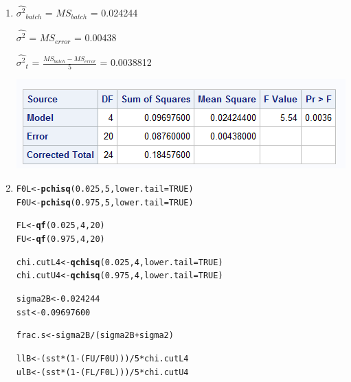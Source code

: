 \documentclass{article}\usepackage[]{graphicx}\usepackage[]{color}
\makeatletter
\newcommand{\hlnum}[1]{\textcolor[rgb]{0.686,0.059,0.569}{#1}}%
\newcommand{\hlopt}[1]{\textcolor[rgb]{0,0,0}{#1}}%
\newcommand{\hlstd}[1]{\textcolor[rgb]{0.345,0.345,0.345}{#1}}%
\newcommand{\hlkwb}[1]{\textcolor[rgb]{0.69,0.353,0.396}{#1}}%
\newcommand{\hlkwc}[1]{\textcolor[rgb]{0.333,0.667,0.333}{#1}}%
\newcommand{\hlkwd}[1]{\textcolor[rgb]{0.737,0.353,0.396}{\textbf{#1}}}%
\newenvironment{kframe}{%
 \def\at@end@of@kframe{}%
 \ifinner\ifhmode%
  \def\at@end@of@kframe{\end{minipage}}%
  \begin{minipage}{\columnwidth}%
 \fi\fi%
 \def\FrameCommand##1{\hskip\@totalleftmargin \hskip-\fboxsep
 \colorbox{shadecolor}{##1}\hskip-\fboxsep
     \hskip-\linewidth \hskip-\@totalleftmargin \hskip\columnwidth}%
 \MakeFramed {\advance\hsize-\width
   \@totalleftmargin\z@ \linewidth\hsize
   \@setminipage}}%
 {\par\unskip\endMakeFramed%
 \at@end@of@kframe}
\newenvironment{knitrout}{}{} %
\makeatother
\begin{document}
\begin{enumerate}
\begin{enumerate}
\item %

$\hat{\sigma^{2}}_{batch}$ = $MS_{batch}$ = 0.024244

$\hat{\sigma^{2}}$ = $MS_{error}$ = 0.00438

$\hat{\sigma^{2}}_{t}$ = $\frac{MS_{batch} - MS_{error}}{5}$ = 0.0038812

\includegraphics{prob3ss}

\item %

\begin{knitrout}\footnotesize
{}\color{fgcolor}\begin{kframe}
\begin{alltt}
\hlstd{F0L} \hlkwb{<-} \hlkwd{pchisq}\hlstd{(}\hlnum{0.025}\hlstd{,}\hlnum{5}\hlstd{,} \hlkwc{lower.tail} \hlstd{=} \hlnum{TRUE}\hlstd{)}
\hlstd{F0U} \hlkwb{<-} \hlkwd{pchisq}\hlstd{(}\hlnum{0.975}\hlstd{,}\hlnum{5}\hlstd{,}\hlkwc{lower.tail} \hlstd{=} \hlnum{TRUE}\hlstd{)}

\hlstd{FL} \hlkwb{<-} \hlkwd{qf}\hlstd{(}\hlnum{0.025}\hlstd{,}\hlnum{4}\hlstd{,}\hlnum{20}\hlstd{)}
\hlstd{FU} \hlkwb{<-} \hlkwd{qf}\hlstd{(}\hlnum{0.975}\hlstd{,}\hlnum{4}\hlstd{,}\hlnum{20}\hlstd{)}


\hlstd{chi.cutL4} \hlkwb{<-} \hlkwd{qchisq}\hlstd{(}\hlnum{0.025}\hlstd{,}\hlnum{4}\hlstd{,} \hlkwc{lower.tail} \hlstd{=} \hlnum{TRUE}\hlstd{)}
\hlstd{chi.cutU4} \hlkwb{<-} \hlkwd{qchisq}\hlstd{(}\hlnum{0.975}\hlstd{,}\hlnum{4}\hlstd{,} \hlkwc{lower.tail} \hlstd{=} \hlnum{TRUE}\hlstd{)}

\hlstd{sigma2B} \hlkwb{<-} \hlnum{0.024244}
\hlstd{sst} \hlkwb{<-} \hlnum{0.09697600}

\hlstd{frac.s} \hlkwb{<-} \hlstd{sigma2B}\hlopt{/}\hlstd{(sigma2B} \hlopt{+} \hlstd{sigma2)}

\hlstd{llB} \hlkwb{<-} \hlstd{(sst}\hlopt{*}\hlstd{(}\hlnum{1}\hlopt{-}\hlstd{(FU}\hlopt{/}\hlstd{F0U)))}\hlopt{/}\hlnum{5}\hlopt{*}\hlstd{chi.cutL4}
\hlstd{ulB} \hlkwb{<-} \hlstd{(sst}\hlopt{*}\hlstd{(}\hlnum{1}\hlopt{-}\hlstd{(FL}\hlopt{/}\hlstd{F0L)))}\hlopt{/}\hlnum{5}\hlopt{*}\hlstd{chi.cutU4}


\end{alltt}
\end{kframe}
\end{knitrout}
\end{enumerate}
\end{enumerate}
\end{document}
